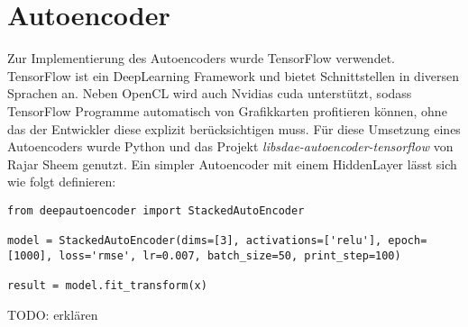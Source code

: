 \section{Autoencoder}

Zur Implementierung des Autoencoders wurde TensorFlow verwendet. TensorFlow ist ein DeepLearning Framework und bietet Schnittstellen in diversen Sprachen an. Neben OpenCL wird auch Nvidias cuda unterstützt, sodass TensorFlow Programme automatisch von Grafikkarten profitieren können, ohne das der Entwickler diese explizit berücksichtigen muss. Für diese Umsetzung eines Autoencoders wurde Python und das Projekt \textit{libsdae-autoencoder-tensorflow} von Rajar Sheem genutzt. Ein simpler Autoencoder mit einem HiddenLayer lässt sich wie folgt definieren:

\lstset{language=Python}
\begin{lstlisting}
from deepautoencoder import StackedAutoEncoder

model = StackedAutoEncoder(dims=[3], activations=['relu'], epoch=[1000], loss='rmse', lr=0.007, batch_size=50, print_step=100)
                       
result = model.fit_transform(x)
\end{lstlisting}

TODO: erklären